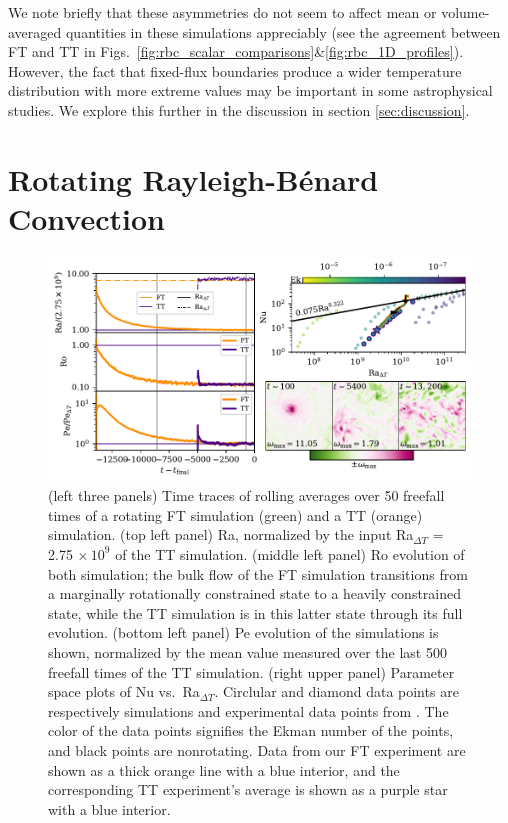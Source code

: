 \documentclass[aps, pre, onecolumn, nofootinbib, notitlepage, groupedaddress, amsfonts, amssymb, amsmath, longbibliography, superscriptaddress]{revtex4-1}
\newcommand{\RB}{Rayleigh-B\'{e}nard }
\begin{document}
We note briefly that these asymmetries do not seem to affect mean or volume-averaged quantities in these simulations appreciably (see the agreement between FT and TT in Figs.~\ref{fig:rbc_scalar_comparisons}\&\ref{fig:rbc_1D_profiles}).
However, the fact that fixed-flux boundaries produce a wider temperature distribution with more extreme values may be important in some astrophysical studies.
We explore this further in the discussion in section \ref{sec:discussion}.





\section{Rotating \RB Convection}
\label{sec:rotating_results}
\begin{figure}
\includegraphics[width=\textwidth]{./figs/rotating_panels.pdf}
\caption{ 
	(left three panels) Time traces of rolling averages over 50 freefall times of a rotating FT simulation (green) and a TT (orange) simulation.
	(top left panel) Ra, normalized by the input Ra$_{\Delta T}$ = 2.75$\,\times 10^9$ of the TT simulation.
	(middle left panel) Ro evolution of both simulation; the bulk flow of the FT simulation transitions from a marginally rotationally constrained state to a heavily constrained state, while the TT simulation is in this latter state through its full evolution.
	(bottom left panel) Pe evolution of the simulations is shown, normalized by the mean value measured over the last 500 freefall times of the TT simulation.
	(right upper panel) Parameter space plots of Nu vs.~Ra$_{\Delta T}$.
	Circlular and diamond data points are respectively simulations and experimental data points from \cite{cheng&all2015}.
	The color of the data points signifies the Ekman number of the points, and black points are nonrotating.
	Data from our FT experiment are shown as a thick orange line with a blue interior, and the corresponding TT experiment's average is shown as a purple star with a blue interior.
}
\end{figure}
\end{document}
